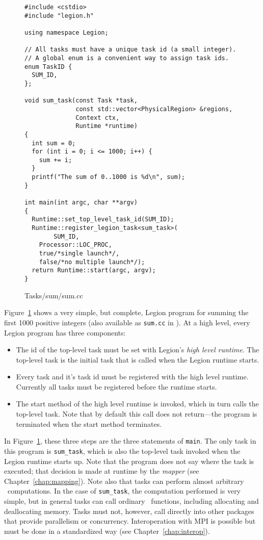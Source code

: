 \begin{figure}
\begin{lstlisting}
#include <cstdio>
#include "legion.h"

using namespace Legion;

// All tasks must have a unique task id (a small integer).
// A global enum is a convenient way to assign task ids.
enum TaskID {
  SUM_ID,
};

void sum_task(const Task *task,
              const std::vector<PhysicalRegion> &regions,
              Context ctx, 
              Runtime *runtime)
{
  int sum = 0;
  for (int i = 0; i <= 1000; i++) {
    sum += i;
  }
  printf("The sum of 0..1000 is %d\n", sum);
}

int main(int argc, char **argv)
{
  Runtime::set_top_level_task_id(SUM_ID);
  Runtime::register_legion_task<sum_task>(
        SUM_ID,
	Processor::LOC_PROC, 
	true/*single launch*/, 
	false/*no multiple launch*/);
  return Runtime::start(argc, argv);
}
\end{lstlisting}
\caption{Tasks/sum/sum.cc}
\label{fig:simple}
\end{figure}

Figure~\ref{fig:simple} shows a very simple, but complete, Legion program for summing
the first 1000 positive integers (also available as {\tt sum.cc} in ).  
At a high level, every Legion program has three components:
\begin{itemize}
\item The id of the top-level task must be set with Legion's {\em high level runtime}.  The top-level
task is the initial task that is called when the Legion runtime starts.
\item Every task and it's task id must be registered with the high level runtime.  Currently all tasks
must be registered before the runtime starts.
\item The start method of the high level runtime is invoked, which in turn calls the top-level task.
Note that by default this call does not return---the program is terminated when the start method terminates.
\end{itemize}
In Figure~\ref{fig:simple}, these three steps are the three statements of {\tt main}.  
The only task in this program is {\tt sum\_task}, which is also the top-level task invoked when the
Legion runtime starts up.  Note that the program does not say where the task is executed; that decision is made
at runtime by the {\em mapper} (see Chapter~\ref{chap:mapping}).  Note also that tasks can perform almost arbitrary
\Cpp\ computations.  In the case of {\tt sum\_task}, the computation performed is very simple, but in general tasks
can call ordinary \Cpp\ functions, including allocating and deallocating memory.  Tasks must not, however,
call directly into other packages that provide parallelism or concurrency.  Interoperation with MPI is
possible but must be done in a standardized way (see Chapter~\ref{chap:interop}).  

